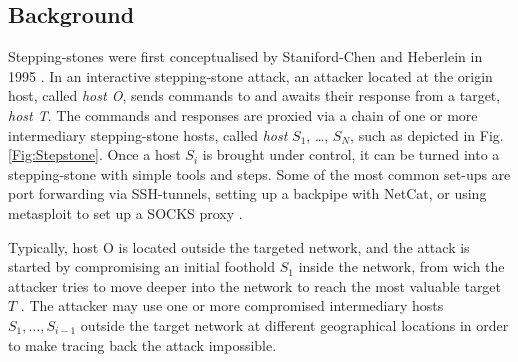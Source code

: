 \documentclass[runningheads,11pt]{llncs}\usepackage[]{graphicx}\usepackage[]{color}
\begin{document}
\subsection{Background}


 
Stepping-stones were first conceptualised by Staniford-Chen and Heberlein in 1995 \cite{staniford1995holding}. In an interactive stepping-stone attack, an attacker located at the origin host, called \textit{host O}, sends commands to and awaits their response from a target, \textit{host T}. The commands and responses are proxied via a chain of one or more intermediary stepping-stone hosts, called \textit{host} $S_1$, \dots, $S_N$, such as depicted in Fig. \ref{Fig:Stepstone}. 
Once a host $S_i$ is brought under control, it can be turned into a stepping-stone with simple tools and steps. Some of the most common set-ups are port forwarding via SSH-tunnels, setting up a backpipe with NetCat, or using metasploit to set up a SOCKS proxy \cite{pivoting2015}.

Typically, host O is located outside the targeted network, and the attack is started by compromising an initial foothold $S_1$ inside the network, from wich the attacker tries to move deeper into the network to reach the most valuable target $T$ \cite{Mandiant2015trends}. The attacker may use one or more compromised intermediary hosts $S_1,\dots, S_{i-1}$ outside the target network at different geographical locations in order to make tracing back the attack impossible. 
\end{document}
